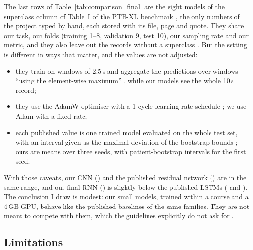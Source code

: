 The last rows of Table~\ref{tab:comparison_final} are the eight models of the superclass column of
Table~I of the PTB-XL benchmark \cite[p.~1523]{strodthoff2021deep}, the only numbers of the project typed by hand,
each stored with its file, page and quote. They share our task, our folds (training 1--8, validation 9,
test 10), our sampling rate and our metric, and they also leave out the records without a superclass
\cite[pp.~1520--1523]{strodthoff2021deep}. But the setting is different in ways that matter, and the values are not
adjusted:
\begin{itemize}[leftmargin=1.2em,itemsep=1pt]
  \item they train on windows of 2.5\,s and aggregate the predictions over windows ``using the
        element-wise maximum'' \cite[p.~1521]{strodthoff2021deep}, while our models see the whole 10\,s record;
  \item they use the AdamW optimiser with a 1-cycle learning-rate schedule \cite[p.~1521]{strodthoff2021deep};
        we use Adam with a fixed rate;
  \item each published value is one trained model evaluated on the whole test set, with an interval given
        as the maximal deviation of the bootstrap bounds \cite[p.~1522]{strodthoff2021deep}; ours are means over
        three seeds, with patient-bootstrap intervals for the first seed.
\end{itemize}
With those caveats, our CNN (\comparisonTestAurocMeanTwelveCnn{}) and the published residual network
(\comparisonPublishedStrodthoffResnetOneDWang{}) are in the same range, and our final RNN
(\comparisonTestAurocMeanTwelveRnn{}) is slightly below the published LSTMs
(\comparisonPublishedStrodthoffLstm{} and \comparisonPublishedStrodthoffLstmBidir{}). The conclusion I draw is modest: our small models, trained
within a course and a 4\,GB GPU, behave like the published baselines of the same families. They are not
meant to compete with them, which the guidelines explicitly do not ask for \cite{course_message_2011}.



\subsection{Limitations}

